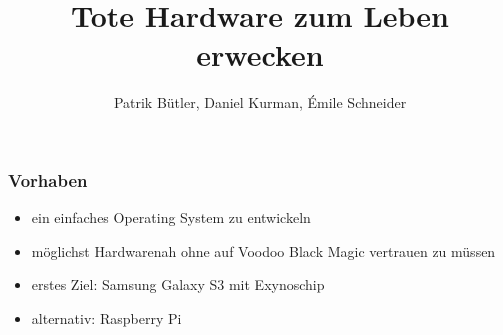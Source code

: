 \documentclass[11pt]{beamer}
\author{Patrik Bütler, Daniel Kurman, Émile Schneider}
\title{Tote Hardware zum Leben erwecken}
\begin{document}
\begin{frame}
\titlepage
\end{frame}

\begin{frame}
\frametitle{Vorhaben}

\begin{itemize}
 \item<1-> ein einfaches Operating System zu entwickeln
 \item<2-> möglichst Hardwarenah ohne auf Voodoo Black Magic vertrauen zu müssen
\item<3-> erstes Ziel: Samsung Galaxy S3 mit Exynoschip
\item<4-> alternativ: Raspberry Pi
\end{itemize}
\end{frame}
\end{document}
